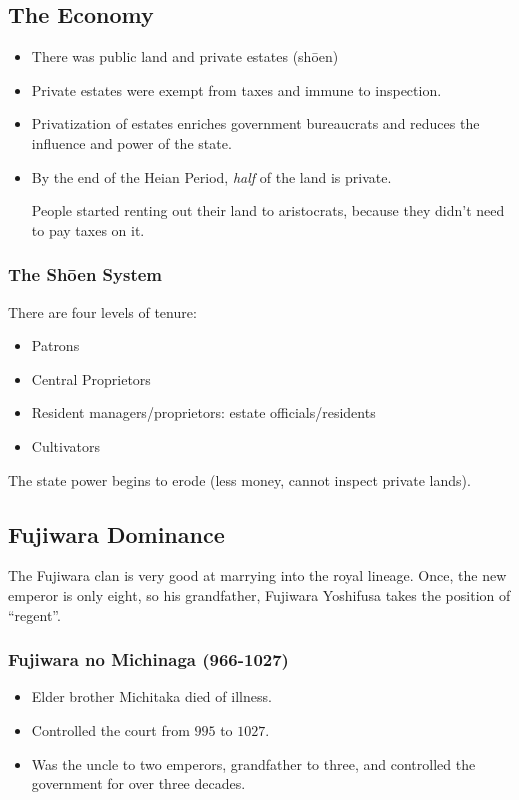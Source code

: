 \documentclass[class=article, crop=false]{standalone}
\begin{document}
  \subsection{The Economy}
  \begin{itemize}
    \item There was public land and private estates (sh\=oen)
    \item Private estates were exempt from taxes and immune to inspection.
    \item Privatization of estates enriches government bureaucrats and reduces the influence and power of the state.
    \item By the end of the Heian Period, \emph{half} of the land is private.
    \begin{note}{}
      People started renting out their land to aristocrats, because they didn't need to pay taxes on it.
    \end{note}
  \end{itemize}
  \subsubsection{The Sh\=oen System}
  There are four levels of tenure:
  \begin{itemize}
    \item Patrons
    \item Central Proprietors
    \item Resident managers/proprietors: estate officials/residents
    \item Cultivators
  \end{itemize}
  \begin{note}{}
    The state power begins to erode (less money, cannot inspect private lands).
  \end{note}
  \subsection{Fujiwara Dominance}
  The Fujiwara clan is very good at marrying into the royal lineage. Once, the new emperor is only eight, so his grandfather, Fujiwara Yoshifusa takes the position of ``regent''.
  \subsubsection{Fujiwara no Michinaga (966-1027)}
  \begin{itemize}
    \item Elder brother Michitaka died of illness.
    \item Controlled the court from $995$ to $1027$.
    \item Was the uncle to two emperors, grandfather to three, and controlled the government for over three decades.
  \end{itemize}
\end{document}

